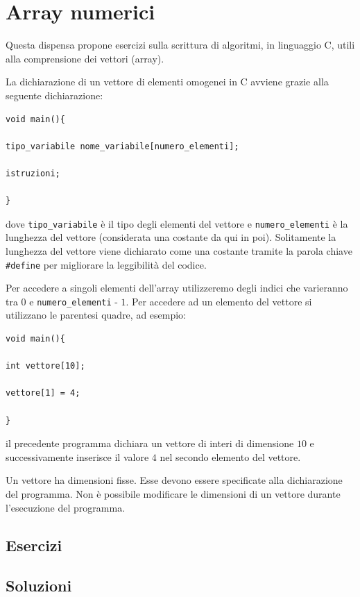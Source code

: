 \documentclass[oneside]{scrbook}
\begin{document}
\chapter{Array numerici}
Questa dispensa propone esercizi sulla scrittura di algoritmi, in linguaggio C, utili alla comprensione dei vettori (array). 

La dichiarazione di un vettore di elementi omogenei in C avviene grazie alla seguente dichiarazione:
\begin{lstlisting}[style=cstyle]
void main(){

tipo_variabile nome_variabile[numero_elementi];

istruzioni;

}
\end{lstlisting}
dove \texttt{tipo\_variabile} \`e il tipo degli elementi del vettore e \texttt{numero\_elementi}  \`e la lunghezza del vettore (considerata una costante da qui in poi). Solitamente la lunghezza del vettore viene dichiarato come una costante tramite la parola chiave \texttt{\#define} per migliorare la leggibilit\`a del codice.

Per accedere a singoli elementi dell'array utilizzeremo degli indici che varieranno tra $0$ e \texttt{numero\_elementi} - $1$. Per accedere ad un elemento del vettore si utilizzano le parentesi quadre, ad esempio:
\begin{lstlisting}[style=cstyle]
void main(){

int vettore[10];

vettore[1] = 4;

}
\end{lstlisting}
il precedente programma dichiara un vettore di interi di dimensione $10$ e successivamente inserisce il valore $4$ nel secondo elemento del vettore.

Un vettore ha dimensioni fisse. Esse devono essere specificate alla dichiarazione del programma. Non \`e possibile modificare le dimensioni di un vettore durante l'esecuzione del programma.

\clearpage
\section{Esercizi}
















\clearpage
\section*{Soluzioni}
\shipoutAnswer
\end{document}
